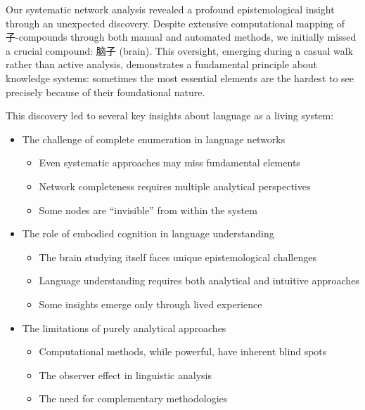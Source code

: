 \documentclass[
  11pt,
  letterpaper,
]{article}
\providecommand{\tightlist}{%
  \setlength{\itemsep}{0pt}\setlength{\parskip}{0pt}}
\begin{document}
Our systematic network analysis revealed a profound epistemological
insight through an unexpected discovery. Despite extensive computational
mapping of 子-compounds through both manual and automated methods, we
initially missed a crucial compound: 脑子 (brain). This oversight,
emerging during a casual walk rather than active analysis, demonstrates
a fundamental principle about knowledge systems: sometimes the most
essential elements are the hardest to see precisely because of their
foundational nature.

This discovery led to several key insights about language as a living
system:

\begin{itemize}
\tightlist
\item
  The challenge of complete enumeration in language networks

  \begin{itemize}
  \tightlist
  \item
    Even systematic approaches may miss fundamental elements
  \item
    Network completeness requires multiple analytical perspectives
  \item
    Some nodes are ``invisible'' from within the system
  \end{itemize}
\item
  The role of embodied cognition in language understanding

  \begin{itemize}
  \tightlist
  \item
    The brain studying itself faces unique epistemological challenges
  \item
    Language understanding requires both analytical and intuitive
    approaches
  \item
    Some insights emerge only through lived experience
  \end{itemize}
\item
  The limitations of purely analytical approaches

  \begin{itemize}
  \tightlist
  \item
    Computational methods, while powerful, have inherent blind spots
  \item
    The observer effect in linguistic analysis
  \item
    The need for complementary methodologies
  \end{itemize}
\end{itemize}
\end{document}
